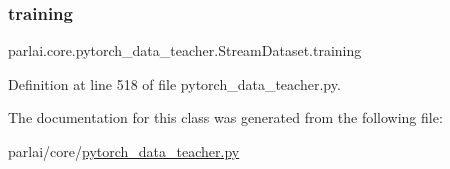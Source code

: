 \mbox{\label{classparlai_1_1core_1_1pytorch__data__teacher_1_1StreamDataset_a57104c9e186b0a6d78e6d0ac4c0ab1db}} 
\subsubsection{\texorpdfstring{training}{training}}
{\footnotesize\ttfamily parlai.\+core.\+pytorch\+\_\+data\+\_\+teacher.\+Stream\+Dataset.\+training}



Definition at line 518 of file pytorch\+\_\+data\+\_\+teacher.\+py.



The documentation for this class was generated from the following file\+:\begin{DoxyCompactItemize}
\item 
parlai/core/\hyperlink{pytorch__data__teacher_8py}{pytorch\+\_\+data\+\_\+teacher.\+py}\end{DoxyCompactItemize}
